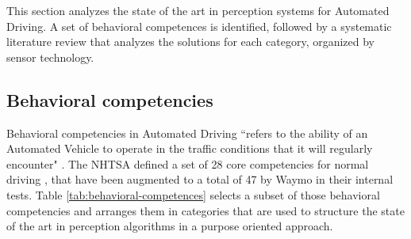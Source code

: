 
This section analyzes the state of the art in perception systems for Automated
Driving. A set of behavioral competences is identified, followed
by a systematic literature review that analyzes the 
solutions for each category, organized by sensor technology.

\subsection{Behavioral competencies}

Behavioral competencies in Automated Driving ``refers to the ability of an 
Automated Vehicle to operate in the traffic conditions that it will regularly
encounter" \cite{Nowakowski2015}. The NHTSA defined a set of 28 core 
competencies for normal driving \cite{NHTSA2016}, that have been augmented to a 
total of 47 by Waymo \cite{Waymo2017} in their internal tests.
Table \ref{tab:behavioral-competences} selects a subset of those behavioral
competencies and arranges them in categories that are used to structure the state of the art in
perception algorithms in a purpose oriented approach.

